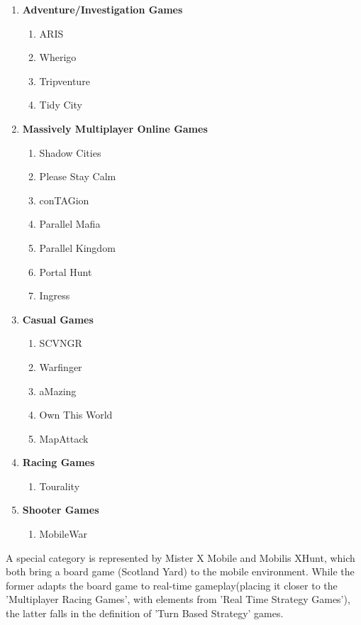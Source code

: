\documentclass{article}
\begin{document}
\begin{enumerate}
  \item \textbf{Adventure/Investigation Games}
  		\begin{enumerate}
  	  		\item ARIS
  	  		\item Wherigo
  	  		\item Tripventure
  	  		\item Tidy City	  
  		\end{enumerate}
  		
  \item \textbf{Massively Multiplayer Online Games}
  		\begin{enumerate}
  	  		\item Shadow Cities
  	  		\item Please Stay Calm
  	  		\item conTAGion
  	  		\item Parallel Mafia
  	  		\item Parallel Kingdom
  	  		\item Portal Hunt
  	  		\item Ingress
  		\end{enumerate}
  		
  \item \textbf{Casual Games}
  		\begin{enumerate}
  	  		\item SCVNGR
  	  		\item Warfinger  	  		
  	  		\item aMazing 	
  	  		\item Own This World
  	  		\item MapAttack	  	  		
  		\end{enumerate}
  		  		  		
  \item \textbf{Racing Games}
  		\begin{enumerate}
  	  		\item Tourality  	  		 	  		  	  		
  		\end{enumerate}
  		
  \item \textbf{Shooter Games}
  		\begin{enumerate}
  	  		\item MobileWar	  		  	  		
  		\end{enumerate}  
\end{enumerate}

A special category is represented by Mister X Mobile and Mobilis XHunt, which
both bring a board game (Scotland Yard) to the mobile environment. While the
former adapts the board game to real-time gameplay(placing it closer to the
'Multiplayer Racing Games', with elements from 'Real Time Strategy Games'), the
latter falls in the definition of 'Turn Based Strategy' games.
\end{document}
